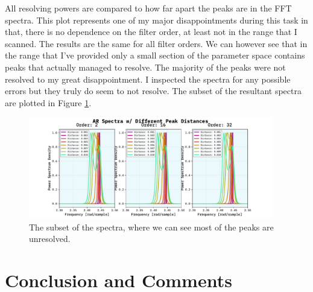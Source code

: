 \documentclass[10pt, titlepage, a4paper]{article}
\begin{document}
All resolving powers are compared to how far apart the peaks are in the FFT spectra. This plot represents one of my major disappointments
during this task in that, there is no dependence on the filter order, at least not in the range that I scanned. The results are 
the same for all filter orders. We can however see that in the range that I've provided only a small section of the parameter 
space contains peaks that actually managed to resolve. The majority of the peaks were not resolved to my great disappointment.
I inspected the spectra for any possible errors but they truly do seem to not resolve. The subset of the resultant spectra 
are plotted in Figure \ref{fig:resolving-power-spectra}.

\begin{figure}[H]
    \centering
    \includegraphics[width=0.95\textwidth]{../MaxEntropy/Images/ar-spectra.pdf}
    \caption{The subset of the spectra, where we can see most of the peaks are unresolved.}
    \label{fig:resolving-power-spectra}
\end{figure}


\section{Conclusion and Comments}

% 
% 

\end{document}

